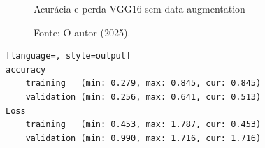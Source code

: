 \begin{figure}[h!]
\centering
\caption{Acurácia e perda VGG16 sem data augmentation}
\hspace*{-2cm} %
\caption*{Fonte: O autor (2025).}
\end{figure}

\begin{lstlisting}[language=, style=output]
accuracy
	training   (min: 0.279, max: 0.845, cur: 0.845)
	validation (min: 0.256, max: 0.641, cur: 0.513)
Loss
	training   (min: 0.453, max: 1.787, cur: 0.453)
	validation (min: 0.990, max: 1.716, cur: 1.716)
\end{lstlisting}


